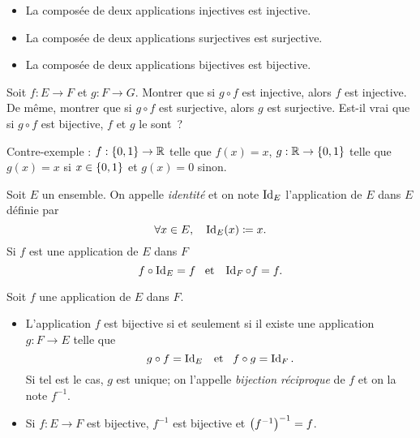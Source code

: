 \documentclass{magnolia}
\begin{document}
\begin{proposition}[utile=-3]
\begin{itemize}
\item La composée de deux applications injectives est injective.
\item La composée de deux applications surjectives est surjective.
\item La composée de deux applications bijectives est bijective.
\end{itemize}
\end{proposition}

\begin{exos}
\exo Soit $f:E\to F$ et $g:F\to G$. Montrer que si $g\circ f$ est injective,
  alors $f$ est injective. De même, montrer que si $g\circ f$ est surjective,
  alors $g$ est surjective.
\exo Est-il vrai que si $g\circ f$ est bijective, $f$ et $g$ le sont~?
\begin{sol}
Contre-exemple : $f:\left\{0,1\right\}\to\mathbb{R}$ telle que $f(x)=x$, $g:\mathbb{R}\to\left\{0,1\right\}$ telle que $g(x)=x$ si $x\in \left\{0,1\right\}$ et $g(x)=0$ sinon.
\end{sol}
\end{exos}

\begin{definition}[utile=-3]
Soit $E$ un ensemble. On appelle \emph{identité} et on note $\operatorname{Id}_E$
l'application de $E$ dans $E$ définie par
\[\forall x\in E ,\quad \operatorname{Id}_E(x)\coloneqq x.\]
Si $f$ est une application de $E$ dans $F$
\[f\circ \operatorname{Id}_E=f \quad\!\text{et}\quad\! \operatorname{Id}_F\circ f=f.\]
\end{definition}

\begin{proposition}[utile=-3]
Soit $f$ une application de $E$ dans $F$.
\begin{itemize}
\item L'application $f$ est bijective si et seulement si il existe une
  application $g:F\to E$ telle que
  \[g\circ f=\operatorname{Id}_E \quad\!\text{et}\quad\! f\circ g=\operatorname{Id}_F.\]
  Si tel est le cas, $g$ est unique; on l'appelle \emph{bijection réciproque} de $f$
  et on la note $f^{-1}$.
\item Si $f:E\to F$ est bijective, $f^{-1}$ est bijective et $\left(f^{-1}\right)^{-1}=f$.
\end{itemize}
\end{proposition}
\end{document}
